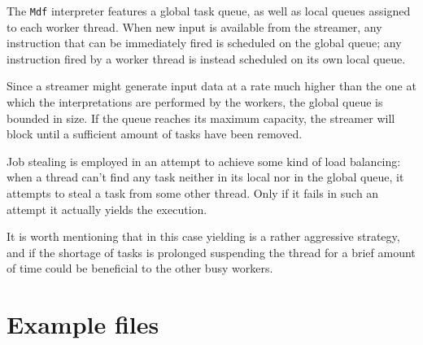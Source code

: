 \documentclass[a4paper, 11pt, oneside]{article}
\begin{document}
The \texttt{Mdf} interpreter features a global task queue, as well as local queues assigned to each worker thread. When new input is available from the streamer, any instruction that can be immediately fired is scheduled on the global queue; any instruction fired by a worker thread is instead scheduled on its own local queue.

Since a streamer might generate input data at a rate much higher than the one at which the interpretations are performed by the workers, the global queue is bounded in size. If the queue reaches its maximum capacity, the streamer will block until a sufficient amount of tasks have been removed.

Job stealing is employed in an attempt to achieve some kind of load balancing: when a thread can't find any task neither in its local nor in the global queue, it attempts to steal a task from some other thread. Only if it fails in such an attempt it actually yields the execution.

It is worth mentioning that in this case yielding is a rather aggressive strategy, and if the shortage of tasks is prolonged suspending the thread for a brief amount of time could be beneficial to the other busy workers.

\section{Example files}
\end{document}

